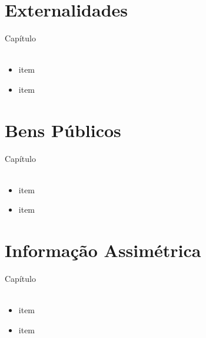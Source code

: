 \documentclass{beamer}[10]
\begin{document}
\section[Externalidades]{Externalidades}
\begin{frame}
	\huge Capítulo \normalsize
	\\~\\
	\begin{itemize}
		\item item
		\item item
	\end{itemize}
\end{frame}


\begin{frame}
	\frametitle{}

	

\end{frame}

\section[B.Públicos]{Bens Públicos}
\begin{frame}
	\huge Capítulo \normalsize
	\\~\\
	\begin{itemize}
		\item item
		\item item
	\end{itemize}
\end{frame}


\begin{frame}
	\frametitle{}

	

\end{frame}

\section[I.Assimétrica]{Informação Assimétrica}
\begin{frame}
	\huge Capítulo \normalsize
	\\~\\
	\begin{itemize}
		\item item
		\item item
	\end{itemize}
\end{frame}


\begin{frame}
	\frametitle{}

	

\end{frame}
\end{document}
